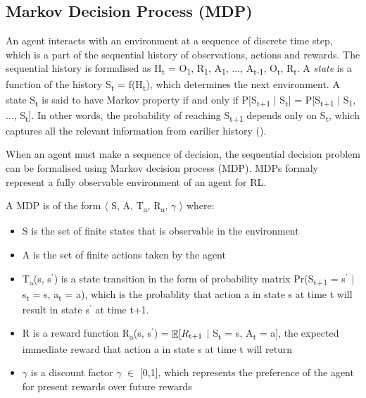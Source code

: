 \documentclass[12pt,twoside]{report}
\DeclareMathOperator{\E}{\mathbb{E}}
\begin{document}
\subsection{Markov Decision Process (MDP)}
\label{mdp_subsection}
An agent interacts with an environment at a sequence of discrete time step, which is a part of the sequential history of observations, actions and rewards. The sequential history is formalised as H\textsubscript{t} = O\textsubscript{1}, R\textsubscript{1}, A\textsubscript{1}, ..., A\textsubscript{t-1}, O\textsubscript{t}, R\textsubscript{t}.  A \textit{state} is a function of the history S\textsubscript{t} = f(H\textsubscript{t}), which determines the next environment.  A state S\textsubscript{t} is said to have Markov property if and only if
P[S\textsubscript{t+1} $\vert$ S\textsubscript{t}] = P[S\textsubscript{t+1} $\vert$ S\textsubscript{1}, ..., S\textsubscript{t}]. In other words, the probability of reaching S\textsubscript{t+1} depends only on S\textsubscript{t}, which captures all the relevant information from earilier history (\cite{Puterman1994}).

When an agent must make a sequence of decision, the sequential decision problem can be formalised using Markov decision process (MDP). MDPs formaly represent a fully observable environment of an agent for RL.

A MDP is of the form $\langle$ S, A, T\textsubscript{a}, R\textsubscript{a}, $\gamma$ $\rangle$ where:

\begin{itemize}
\item S is the set of finite states that is observable in the environment
\item A is the set of finite actions taken by the agent
\item T\textsubscript{a}(s, s$^\prime$) is a state transition in the form of probability matrix Pr(S\textsubscript{t+1} = s$^\prime$ $\vert$ s\textsubscript{t} = s, a\textsubscript{t} = a), which is the probablity that action a in state s at time t will result in state s$^\prime$ at time t+1.
\item R is a reward function R\textsubscript{a}(s, s$^\prime$) = $\displaystyle \E[R\textsubscript{t+1} $ $\vert$ S\textsubscript{t} = s, A\textsubscript{t} = a], the expected immediate reward that action a in state s at time t will return
\item $\gamma$ is a discount factor $\gamma$ $\in$ [0,1], which represents the preference of the agent for present rewards over future rewards
\end{itemize}
\end{document}
